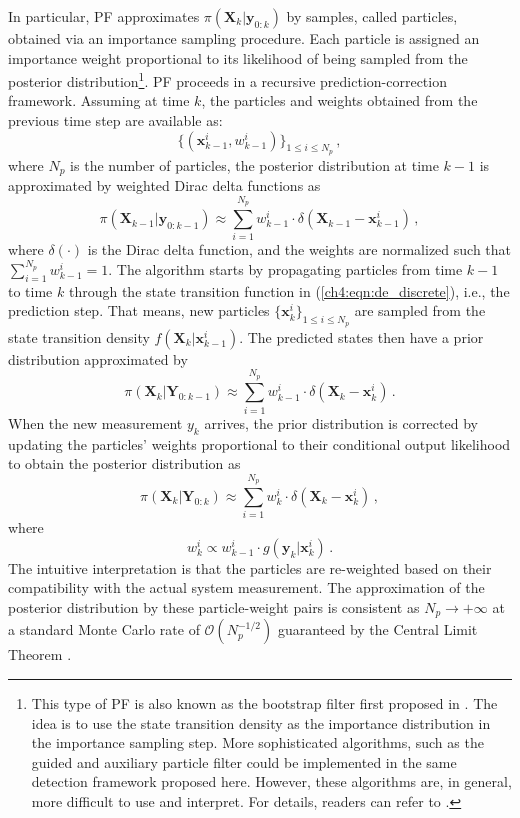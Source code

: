 In particular, PF approximates $\pi(\boldsymbol{X}_k | \boldsymbol{y}_{0:k})$ by samples, called particles, obtained via an importance sampling procedure. Each particle is assigned an importance weight proportional to its likelihood of being sampled from the posterior distribution\footnote{This type of PF is also known as the bootstrap filter first proposed in \cite{Gordon1993}. The idea is to use the state transition density as the importance distribution in the importance sampling step. More sophisticated algorithms, such as the guided and auxiliary particle filter could be implemented in the same detection framework proposed here. However, these algorithms are, in general, more difficult to use and interpret. For details, readers can refer to \cite{doucet2009tutorial}.}. PF proceeds in a recursive prediction-correction framework. Assuming at time $k$, the particles and weights obtained from the previous time step are available as:
$$
\{(\boldsymbol{x}_{k-1}^{i}, w_{k-1}^{i})\}_{1\leq i \leq N_p} \,,
$$ where $N_p$ is the number of particles, the posterior distribution at time $k-1$ is approximated by weighted Dirac delta functions as
\begin{equation}
\pi(\boldsymbol{X}_{k-1} | \boldsymbol{y}_{0:k-1}) \approx \sum_{i=1}^{N_{p}} w_{k-1}^{i} \cdot \delta(\boldsymbol{X}_{k-1}-\boldsymbol{x}_{k-1}^{i}) \,,
\end{equation} 
where $\delta (\cdot)$ is the Dirac delta function, and the weights are normalized such that $\sum_{i=1}^{N_{p}} w_{k-1}^{i} = 1$. The algorithm starts by propagating particles from time $k-1$ to time $k$ through the state transition function in (\ref{ch4:eqn:de_discrete}), i.e., the prediction step. That means, new particles $\{\boldsymbol{x}_k^{i}\}_{1\leq i \leq N_p}$ are sampled from the state transition density $f(\boldsymbol{X}_k|\boldsymbol{x}_{k-1}^{i})$. The predicted states then have a prior distribution approximated by 
\begin{equation}
\label{ch4:eqn:prediction}
\pi(\boldsymbol{X}_k | \boldsymbol{Y}_{0: k-1}) \approx \sum_{i=1}^{N_{p}} w_{k-1}^{i} \cdot \delta(\boldsymbol{X}_k-\boldsymbol{x}_k^{i}) \,.
\end{equation}
When the new measurement $y_k$ arrives, the prior distribution is corrected by updating the particles' weights proportional to their conditional output likelihood to obtain the posterior distribution as 
\begin{equation}
\label{ch4:eqn:particle_approx}
\pi(\boldsymbol{X}_k | \boldsymbol{Y}_{0: k}) \approx \sum_{i=1}^{N_{p}} w_k^{i} \cdot \delta(\boldsymbol{X}_k-\boldsymbol{x}_k^{i}) \,,
\end{equation} where 
$$
w_k^{i} \propto  w_{k-1}^{i} \cdot g(\boldsymbol{y}_k | \boldsymbol{x}_k^{i}) \,.
$$
The intuitive interpretation is that the particles are re-weighted based on their compatibility with the actual system measurement. The approximation of the posterior distribution by these particle-weight pairs is consistent as $N_p \rightarrow +\infty$ at a standard Monte Carlo rate of $\mathcal{O}(N_{p}^{-1/2})$ guaranteed by the Central Limit Theorem \cite{doucet2009tutorial}. 

